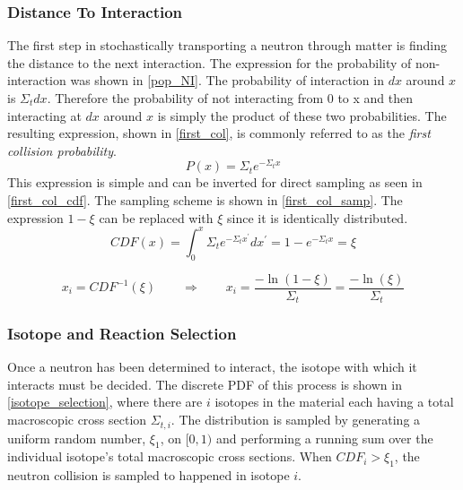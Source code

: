 \subsubsection{Distance To Interaction}

The first step in stochastically transporting a neutron through matter is finding the distance to the next interaction.  The expression for the probability of non-interaction was shown in \eqref{pop_NI}.  The probability of interaction in $dx$ around $x$ is $\Sigma_t dx$.  Therefore the probability of not interacting from 0 to x and then interacting at $dx$ around $x$ is simply the product of these two probabilities.  The resulting expression, shown in \eqref{first_col}, is commonly referred to as the \emph{first collision probability}.
%
\begin{equation}
\label{first_col}
P(x) = \Sigma_t e^{- \Sigma_t  x}
\end{equation}
%
This expression is simple and can be inverted for direct sampling as seen in \eqref{first_col_cdf}.  The sampling scheme is shown in \eqref{first_col_samp}.  The expression $1-\xi$ can be replaced with $\xi$ since it is identically distributed.
%
\begin{equation}
\label{first_col_cdf}
CDF(x) = \int_0^x \Sigma_t e^{- \Sigma_t  x^\prime} dx^\prime = 1- e^{- \Sigma_t  x} = \xi
\end{equation}

\begin{equation}
\label{first_col_samp}
x_i=CDF^{-1}(\xi) \qquad \Rightarrow \qquad x_i=\frac{-\ln(1-\xi) }{\Sigma_t}=\frac{-\ln(\xi) }{\Sigma_t}
\end{equation}


\subsubsection{Isotope and Reaction Selection}

Once a neutron has been determined to interact, the isotope with which it interacts must be decided.  The discrete PDF of this process is shown in \eqref{isotope_selection}, where there are $i$ isotopes in the material each having a total macroscopic cross section $\Sigma_{t,i}$.  The distribution is sampled by generating a uniform random number, $\xi_1$, on $[0,1)$ and performing a running sum over the individual isotope's total macroscopic cross sections.  When $CDF_i > \xi_1$, the neutron collision is sampled to happened in isotope $i$.

